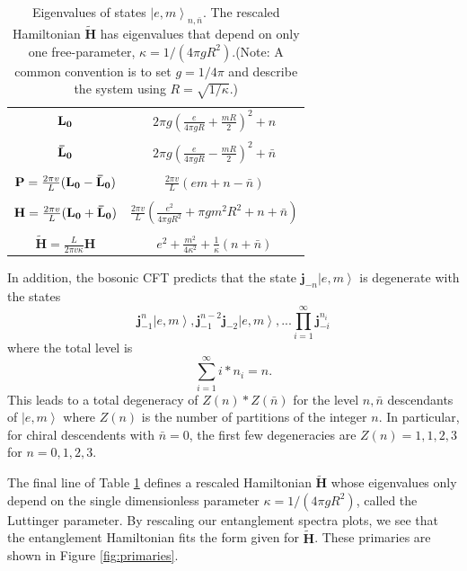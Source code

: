 \documentclass{article}
\newcommand{\ket}[1]{\left |#1 \right \rangle}
\begin{document}
\begin{table}[h]
\centering
\begin{tabular}{c|c}
$\mathbf{L_0}$ & $2\pi g(\frac{e}{4 \pi g R} + \frac{m R}{2})^2 + n$  \\
& \\
$\mathbf{\bar{L}_0}$ & $2\pi g(\frac{e}{4 \pi g R} - \frac{m R}{2})^2 + \bar{n}$  \\
& \\
$\mathbf{P} =\frac{2\pi v}{L}(\mathbf{L_0}-\mathbf{\bar{L}_0})$ & $\frac{2\pi v}{L}(em + n - \bar{n})$ \\
& \\
$\mathbf{H} = \frac{2\pi v}{L}(\mathbf{L_0}+\mathbf{\bar{L}_0})$ & $\frac{2\pi v}{L}(\frac{e^2}{4 \pi g R^2} + \pi g m^2 R^2 + n + \bar{n})$ \\
& \\
$\tilde{\mathbf{H}} = \frac{L}{2 \pi v \kappa}\mathbf{H}$ & $e^2 + \frac{m^2}{4 \kappa^2} + \frac{1}{\kappa}(n + \bar{n})$       
\end{tabular}
\label{Table:EV}
\caption{Eigenvalues of states $\ket{e, m}_{n, \bar{n}}$. The rescaled Hamiltonian $\tilde{\mathbf{H}}$ has eigenvalues that depend on only one free-parameter, $\kappa = 1/(4 \pi g R^2)$.(Note: A common convention is to set $g=1/4\pi$ and describe the system using $R=\sqrt{1/\kappa}$.) }
\end{table}



In addition, the bosonic CFT predicts that the state $ \mathbf{j}_{-n} \ket{e, m}$ is degenerate with the states 
$$ \mathbf{j}_{-1}^n \ket{e, m}, \mathbf{j}_{-1}^{n-2} \mathbf{j}_{-2} \ket{e, m}, ... \prod\limits_{i=1}^{\infty} \mathbf{j}_{-i}^{n_i} $$
 where the total level is  $$\sum\limits_{i=1}^{\infty} i*n_i = n.$$ 
This leads to a total degeneracy of $Z(n)*Z(\bar{n})$ for the level $n, \bar{n}$ descendants of $\ket{e, m}$ where $Z(n)$ is the number of partitions of the integer $n$. In particular, for chiral descendents with $\bar{n} = 0$, the first few degeneracies are $Z(n) = 1, 1, 2, 3$ for $n = 0, 1, 2, 3$.

The final line of Table \ref{Table:EV} defines a rescaled Hamiltonian $\tilde{\mathbf{H}}$ whose eigenvalues only depend on the single dimensionless parameter $\kappa = 1/(4 \pi g R^2)$, called the Luttinger parameter. 
By rescaling our entanglement spectra plots, we see that the entanglement Hamiltonian fits the form given for $\tilde{\mathbf{H}}$. These primaries are shown in Figure  \ref{fig:primaries}. 
\end{document}
